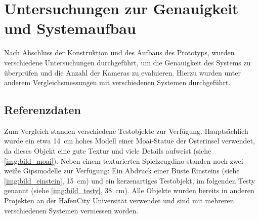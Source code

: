 \documentclass[./00PhotoBox.tex]{subfiles}
\begin{document}
\chapter{Untersuchungen zur Genauigkeit und Systemaufbau}
\label{c:versuche}
Nach Abschluss der Konstruktion und des Aufbaus des Prototyps, wurden verschiedene Untersuchungen durchgeführt, um die Genauigkeit des Systems zu überprüfen und die Anzahl der Kameras zu evaluieren. Hierzu wurden unter anderem Vergleichsmessungen mit verschiedenen Systemen durchgeführt.

\section{Referenzdaten}
\label{s:referenzdaten}
Zum Vergleich standen verschiedene Testobjekte zur Verfügung. Hauptsächlich wurde ein etwa \SI{14}{\centi\metre} hohes Modell einer Moai-Statue der Osterinsel verwendet, da dieses Objekt eine gute Textur und viele Details aufweist (siehe \autoref{img:bild_moai}). Neben einem texturierten Spielzeugdino standen noch zwei weiße Gipsmodelle zur Verfügung: Ein Abdruck einer Büste Einsteins  (siehe \autoref{img:bild_einstein}, \SI{15}{\centi\metre}) und ein kerzenartiges Testobjekt, im folgenden Testy genannt (siehe \autoref{img:bild_testy}, \SI{38}{\centi\metre}). Alle Objekte wurden bereits in anderen Projekten an der HafenCity Universität verwendet \citep[vgl. z.\,B.][]{kersten_scanner} und sind mit mehreren verschiedenen Systemen vermessen worden.
\end{document}
